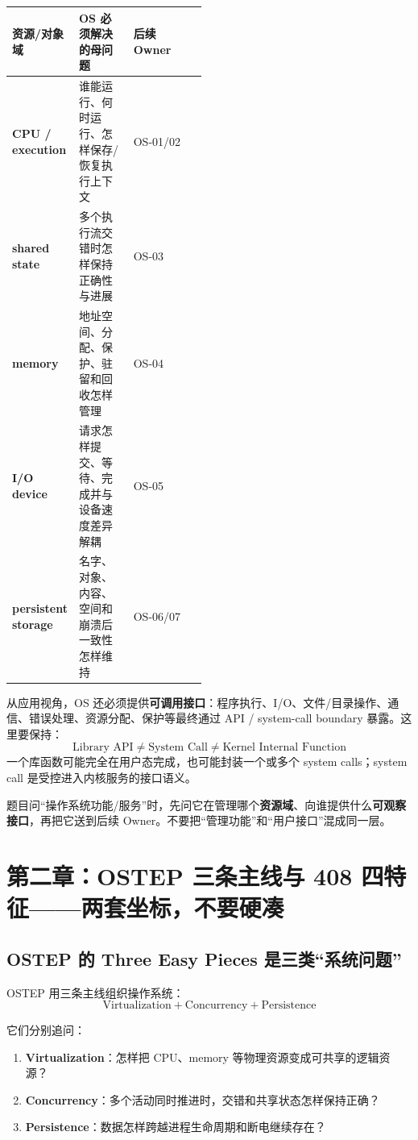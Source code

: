 \documentclass[11pt,a4paper]{ctexart}
\newcommand{\kw}[1]{\textbf{#1}}
\begin{document}
\begin{center}
\begin{tabularx}{\linewidth}{>{\bfseries}p{0.20\linewidth} p{0.28\linewidth} X}
\toprule
资源/对象域 & OS 必须解决的母问题 & 后续 Owner\\
\midrule
CPU / execution & 谁能运行、何时运行、怎样保存/恢复执行上下文 & OS-01/02\\
shared state & 多个执行流交错时怎样保持正确性与进展 & OS-03\\
memory & 地址空间、分配、保护、驻留和回收怎样管理 & OS-04\\
I/O device & 请求怎样提交、等待、完成并与设备速度差异解耦 & OS-05\\
persistent storage & 名字、对象、内容、空间和崩溃后一致性怎样维持 & OS-06/07\\
\bottomrule
\end{tabularx}
\end{center}

从应用视角，OS 还必须提供\kw{可调用接口}：程序执行、I/O、文件/目录操作、通信、错误处理、资源分配、保护等最终通过 API / system-call boundary 暴露。这里要保持：
\[
\boxed{\text{Library API}\neq\text{System Call}\neq\text{Kernel Internal Function}}
\]
一个库函数可能完全在用户态完成，也可能封装一个或多个 system calls；system call 是受控进入内核服务的接口语义。

\begin{exam}[功能题第一动作]
题目问“操作系统功能/服务”时，先问它在管理哪个\kw{资源域}、向谁提供什么\kw{可观察接口}，再把它送到后续 Owner。不要把“管理功能”和“用户接口”混成同一层。
\end{exam}

\section{第二章：OSTEP 三条主线与 408 四特征——两套坐标，不要硬凑}

\subsection{OSTEP 的 Three Easy Pieces 是三类“系统问题”}

OSTEP 用三条主线组织操作系统：
\[
\boxed{\text{Virtualization}+\text{Concurrency}+\text{Persistence}}
\]

它们分别追问：
\begin{enumerate}
  \item \kw{Virtualization}：怎样把 CPU、memory 等物理资源变成可共享的逻辑资源？
  \item \kw{Concurrency}：多个活动同时推进时，交错和共享状态怎样保持正确？
  \item \kw{Persistence}：数据怎样跨越进程生命周期和断电继续存在？
\end{enumerate}
\end{document}
